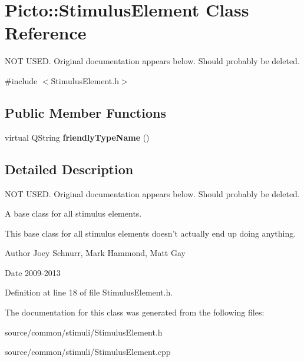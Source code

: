 \hypertarget{class_picto_1_1_stimulus_element}{\section{Picto\-:\-:Stimulus\-Element Class Reference}
\label{class_picto_1_1_stimulus_element}
}


N\-O\-T U\-S\-E\-D. Original documentation appears below. Should probably be deleted.  




{\ttfamily \#include $<$Stimulus\-Element.\-h$>$}

\subsection*{Public Member Functions}
\begin{DoxyCompactItemize}
\item 
\hypertarget{class_picto_1_1_stimulus_element_ad30b82bb133f53f98810bed1ec7df6fa}{virtual Q\-String {\bfseries friendly\-Type\-Name} ()}\label{class_picto_1_1_stimulus_element_ad30b82bb133f53f98810bed1ec7df6fa}

\end{DoxyCompactItemize}


\subsection{Detailed Description}
N\-O\-T U\-S\-E\-D. Original documentation appears below. Should probably be deleted. 

A base class for all stimulus elements.

This base class for all stimulus elements doesn't actually end up doing anything. \begin{DoxyAuthor}{Author}
Joey Schnurr, Mark Hammond, Matt Gay 
\end{DoxyAuthor}
\begin{DoxyDate}{Date}
2009-\/2013 
\end{DoxyDate}


Definition at line 18 of file Stimulus\-Element.\-h.



The documentation for this class was generated from the following files\-:\begin{DoxyCompactItemize}
\item 
source/common/stimuli/Stimulus\-Element.\-h\item 
source/common/stimuli/Stimulus\-Element.\-cpp\end{DoxyCompactItemize}
